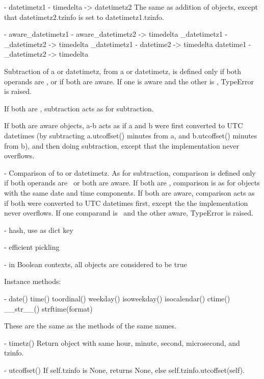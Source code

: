 {    - datetimetz1 - timedelta -> datetimetz2
      The same as addition of  objects, except that
      datetimetz2.tzinfo is set to datetimetz1.tzinfo.

    - aware_datetimetz1 - aware_datetimetz2 -> timedelta
      \naive\_datetimetz1 - \naive\_datetimetz2 -> timedelta
      \naive\_datetimetz1 - datetime2 -> timedelta
      datetime1 - \naive\_datetimetz2 -> timedelta

      Subtraction of a  or datetimetz, from a  or
      datetimetz, is defined only if both operands are \naive, or if
      both are aware.  If one is aware and the other is \naive, TypeError
      is raised.

      If both are \naive, subtraction acts as for  subtraction.

      If both are aware  objects, a-b acts as if a and b were
      first converted to UTC datetimes (by subtracting a.utcoffset()
      minutes from a, and b.utcoffset() minutes from b), and then doing
       subtraction, except that the implementation never
      overflows.

    - Comparison of  to  or datetimetz.  As for
      subtraction, comparison is defined only if both operands are
      \naive\ or both are aware.  If both are \naive, comparison is as
      for  objects with the same date and time components.
      If both are aware, comparison acts as if both were converted to
      UTC datetimes first, except the the implementation never
      overflows.  If one comparand is \naive\ and the other aware,
      TypeError is raised.

    - hash, use as dict key

    - efficient pickling

    - in Boolean contexts, all  objects are considered to be
      true

Instance methods:

  - date()
    time()
    toordinal()
    weekday()
    isoweekday()
    isocalendar()
    ctime()
    __str__()
    strftime(format)

    These are the same as the  methods of the same names.

  - timetz()
    Return  object with same hour, minute, second, microsecond,
    and tzinfo.

  - utcoffset()
    If self.tzinfo is None, returns None, else self.tzinfo.utcoffset(self).

}
